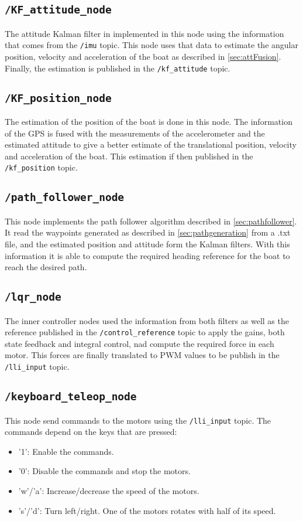 \subsection*{\lstinline[style=cinline]{/KF_attitude_node}}
The attitude Kalman filter in implemented in this node using the information that comes from the \lstinline[style=cinline]{/imu} topic. This node uses that data to estimate the angular position, velocity and acceleration of the boat as described in \autoref{sec:attFusion}. Finally, the estimation is published in the \lstinline[style=cinline]{/kf_attitude} topic.

\subsection*{\lstinline[style=cinline]{/KF_position_node}}
The estimation of the position of the boat is done in this node. The information of the GPS is fused with the measurements of the accelerometer and the estimated attitude to give a better estimate of the translational position, velocity and acceleration of the boat. This estimation if then  published in the \lstinline[style=cinline]{/kf_position} topic.

\subsection*{\lstinline[style=cinline]{/path_follower_node}}
This node implements the path follower algorithm described in \autoref{sec:pathfollower}. It read the waypoints generated as described in \autoref{sec:pathgeneration} from a .txt file, and the estimated position and attitude form the Kalman filters. With this information it is able to compute the required heading reference for the boat to reach the desired path.

\subsection*{\lstinline[style=cinline]{/lqr_node}}
The inner controller nodes used the information from both filters as well as the reference published in the \lstinline[style=cinline]{/control_reference} topic to apply the gains, both state feedback and integral control, nad compute the required force in each motor. This forces are finally translated to PWM values to be publish in the \lstinline[style=cinline]{/lli_input} topic.

\subsection*{\lstinline[style=cinline]{/keyboard_teleop_node}}
This node send commands to the motors using the \lstinline[style=cinline]{/lli_input} topic. The commands depend on the keys that are pressed:
\begin{itemize}
    \item '1': Enable the commands.
    \item '0': Disable the commands and stop the motors.
    \item 'w'/'a': Increase/decrease the speed of the motors.
    \item 's'/'d': Turn left/right. One of the motors rotates with half of its speed.
\end{itemize}
